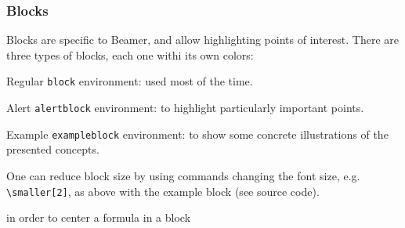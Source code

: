 \documentclass[10pt,    %
    english,            %
    xcolor=table,       %
    envcountsect,       %
    aspectratio=43      %
]{beamer}
\begin{document}
\begin{frame}
        
\end{frame}

\begin{frame}
    \frametitle{Blocks}
    \label{frm:blocks}
    
    Blocks are specific to Beamer, and allow highlighting points of interest. There are three types of blocks, each one withi its own colors:

    \begin{block}{Regular}
        \texttt{block} environment: used most of the time.
    \end{block}

    \begin{alertblock}{Alert}
        \texttt{alertblock} environment: to highlight particularly important points.
    \end{alertblock}

    \begin{exampleblock}{\smaller[2] Example}
        \smaller[2]
        \texttt{exampleblock} environment: to show some concrete illustrations of the presented concepts.
    \end{exampleblock}
    
    One can reduce block size by using commands changing the font size, e.g. \texttt{\textbackslash{}smaller[2]}, as above with the example block (see source code).
    
    in order to center a formula in a block
        
    
    
    
\end{frame}
\end{document}
